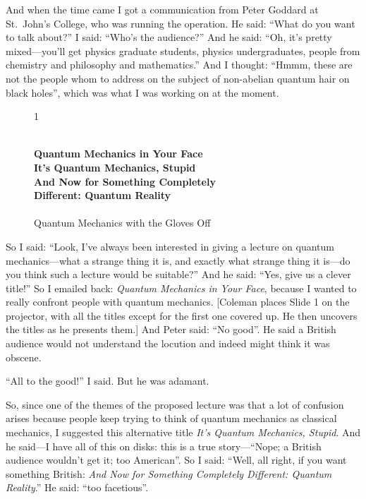 \documentclass[twocolumn,prb]{revtex4}
\begin{document}
And when the time came I got a communication from Peter Goddard at St.~John's College, who was running the operation. He said: ``What do you want to talk about?'' I said: ``Who's the audience?'' And he said: ``Oh, it's pretty mixed---you'll get physics graduate students, physics undergraduates, people from chemistry and philosophy and mathematics.'' And I thought: ``Hmmm, these are not the people whom to address on the subject of non-abelian quantum hair on black holes'', which was what I was working on at the moment.
\begin{figure}[htb] 
\begin{mdframed}
  \vspace{5pt}\hfill 1\\[-15pt]
  \begin{center}
  \begin{obeylines}{\bf
  Quantum Mechanics in Your Face\\[8pt]
  It's Quantum Mechanics, Stupid\\[8pt]
  And Now for Something Completely
  Different: Quantum Reality\\[8pt]
  }
  {Quantum Mechanics with the Gloves Off}\\[10pt]
  \vspace{8pt}
  \end{obeylines}
\end{center}
\end{mdframed}
\end{figure}

So I said: ``Look, I've always been interested in giving a lecture on quantum mechanics---what a strange thing it is, and exactly what strange thing it is---do you think such a lecture would be suitable?'' And he said: ``Yes, give us a clever title!'' So I emailed back: \emph{Quantum Mechanics in Your Face}, because I wanted to really confront people with quantum mechanics. [Coleman places Slide 1 on the projector, with all the titles except for the first one covered up.  He then uncovers the titles as he presents them.] And Peter said: ``No good''. He said a British audience would not understand the locution and indeed might think it was obscene.

``All to the good!'' I said. But he was adamant.

So, since one of the themes of the proposed lecture was that a lot of confusion arises because people keep trying to think of quantum mechanics as classical mechanics, I suggested this alternative title \emph{It's Quantum Mechanics, Stupid}. And he said---I have all of this on disks: this is a true story---``Nope; a British audience wouldn't get it; too American''. So I said: ``Well, all right, if you want something British: \emph{And Now for Something Completely Different: Quantum Reality}.'' He said: ``too facetious''.
\end{document}
